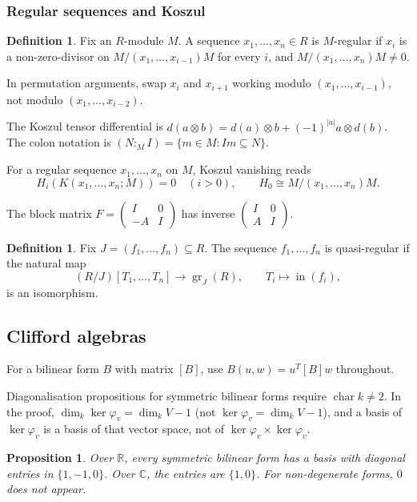 \documentclass[12pt]{article}
\theoremstyle{plain}
\newtheorem{proposition}[thm]{Proposition}
\theoremstyle{definition}
\newtheorem{defn}[thm]{Definition} %
\begin{document}
\subsubsection*{Regular sequences and Koszul}

\begin{defn}
Fix an $R$-module $M$. A sequence $x_1,\ldots,x_n\in R$ is $M$-regular if $x_i$ is a non-zero-divisor on $M/(x_1,\ldots,x_{i-1})M$ for every $i$, and $M/(x_1,\ldots,x_n)M\ne 0$.
\end{defn}

In permutation arguments, swap $x_i$ and $x_{i+1}$ working modulo $(x_1,\ldots,x_{i-1})$, not modulo $(x_1,\ldots,x_{i-2})$.

The Koszul tensor differential is $d(a\otimes b)=d(a)\otimes b+(-1)^{|a|}a\otimes d(b)$. The colon notation is $(N:_M I)=\{m\in M:Im\subseteq N\}$.

For a regular sequence $x_1,\ldots,x_n$ on $M$, Koszul vanishing reads
\[
H_i(K(x_1,\ldots,x_n;M))=0\quad(i>0),\qquad H_0\cong M/(x_1,\ldots,x_n)M.
\]

The block matrix $F=\begin{pmatrix}I&0\\-A&I\end{pmatrix}$ has inverse $\begin{pmatrix}I&0\\A&I\end{pmatrix}$.

\begin{defn}
Fix $J=(f_1,\ldots,f_n)\subseteq R$. The sequence $f_1,\ldots,f_n$ is quasi-regular if the natural map
\[
(R/J)[T_1,\ldots,T_n]\longrightarrow\operatorname{gr}_J(R),\qquad T_i\longmapsto\operatorname{in}(f_i),
\]
is an isomorphism.
\end{defn}

\subsection{Clifford algebras}

For a bilinear form $B$ with matrix $[B]$, use $B(u,w)=u^T[B]w$ throughout.

Diagonalisation propositions for symmetric bilinear forms require $\operatorname{char}k\ne 2$. In the proof, $\dim_k\ker\varphi_v=\dim_k V-1$ (not $\ker\varphi_v=\dim_k V-1$), and a basis of $\ker\varphi_v$ is a basis of that vector space, not of $\ker\varphi_v\times\ker\varphi_v$.

\begin{proposition}
Over $\mathbb{R}$, every symmetric bilinear form has a basis with diagonal entries in $\{1,-1,0\}$. Over $\mathbb{C}$, the entries are $\{1,0\}$. For non-degenerate forms, $0$ does not appear.
\end{proposition}
\end{document}
